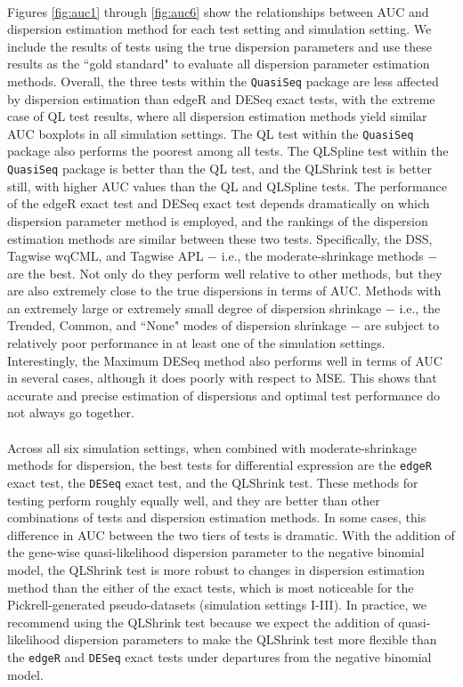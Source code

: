 \documentclass[10pt]{article}
\begin{document}
\paragraph{} \indent Figures \ref{fig:auc1} through \ref{fig:auc6} show the relationships between AUC and dispersion estimation method for each test setting and simulation setting. We include the results of tests using the true dispersion parameters and use these results as the ``gold standard" to evaluate all dispersion parameter estimation methods. Overall, the three tests within the {\tt QuasiSeq} package are less affected by dispersion estimation than edgeR and DESeq exact tests, with the extreme case of QL test results, where all dispersion estimation methods yield similar AUC boxplots in all simulation settings. The QL test within the {\tt QuasiSeq} package also performs the poorest among all tests. The QLSpline test within the {\tt QuasiSeq} package is better than the QL test, and the QLShrink test is better still, with higher AUC values than the QL and QLSpline tests. The performance of the edgeR exact test and DESeq exact test depends dramatically on which dispersion parameter method is employed, and the rankings of the dispersion estimation methods are similar between these two tests. Specifically, the DSS, Tagwise wqCML, and Tagwise APL $-$ i.e., the moderate-shrinkage methods $-$ are the best.  Not only do they perform well relative to other methods, but they are also extremely close to the true dispersions in terms of AUC. Methods with an extremely large or extremely small degree of dispersion shrinkage $-$ i.e., the Trended, Common, and ``None" modes of dispersion shrinkage $-$ are subject to relatively poor performance in at least one of the simulation settings. Interestingly, the Maximum DESeq method also performs well in terms of AUC in several cases, although it does poorly with respect to MSE. This shows that accurate and precise estimation of dispersions and optimal test performance do not always go together.


\paragraph{} \indent Across all six simulation settings, when combined with moderate-shrinkage methods for dispersion, the best tests for differential expression are the {\tt edgeR} exact test, the {\tt DESeq} exact test, and the QLShrink test. These methods for testing perform roughly equally well, and they are better than other combinations of tests and dispersion estimation methods. In some cases, this difference in AUC between the two tiers of tests is dramatic. With the addition of the gene-wise quasi-likelihood dispersion parameter to the negative binomial model, the QLShrink test is more robust to changes in dispersion estimation method than the either of the exact tests, which is most noticeable for the Pickrell-generated pseudo-datasets (simulation settings I-III). In practice, we recommend using the QLShrink test because we expect the addition of quasi-likelihood dispersion parameters to make the QLShrink test more flexible than the {\tt edgeR} and {\tt DESeq} exact tests under departures from the negative binomial model.
\end{document}
